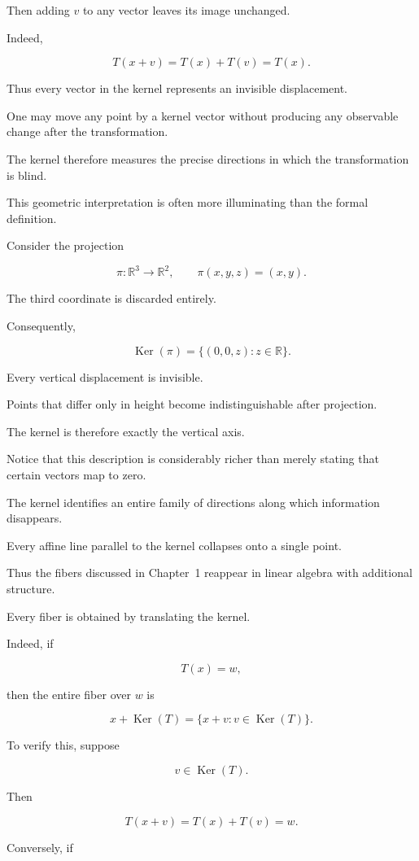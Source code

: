 \documentclass[11pt]{book}
\numberwithin{equation}{chapter}
\theoremstyle{definition}
\theoremstyle{plain}
\theoremstyle{remark}
\DeclareMathOperator{\Ker}{Ker}
\begin{document}
Then adding \(v\) to any vector leaves its image unchanged.

Indeed,

\[
T(x+v)
=
T(x)+T(v)
=
T(x).
\]

Thus every vector in the kernel represents an invisible displacement.

One may move any point by a kernel vector without producing any observable change after the transformation.

The kernel therefore measures the precise directions in which the transformation is blind.

This geometric interpretation is often more illuminating than the formal definition.

Consider the projection

\[
\pi:\mathbb{R}^{3}\rightarrow\mathbb{R}^{2},
\qquad
\pi(x,y,z)
=
(x,y).
\]

The third coordinate is discarded entirely.

Consequently,

\[
\Ker(\pi)
=
\{
(0,0,z):z\in\mathbb{R}
\}.
\]

Every vertical displacement is invisible.

Points that differ only in height become indistinguishable after projection.

The kernel is therefore exactly the vertical axis.

Notice that this description is considerably richer than merely stating that certain vectors map to zero.

The kernel identifies an entire family of directions along which information disappears.

Every affine line parallel to the kernel collapses onto a single point.

Thus the fibers discussed in Chapter~1 reappear in linear algebra with additional structure.

Every fiber is obtained by translating the kernel.

Indeed, if

\[
T(x)=w,
\]

then the entire fiber over \(w\) is

\[
x+\Ker(T)
=
\{
x+v:v\in\Ker(T)
\}.
\]

To verify this, suppose

\[
v\in\Ker(T).
\]

Then

\[
T(x+v)
=
T(x)+T(v)
=
w.
\]

Conversely, if
\end{document}
